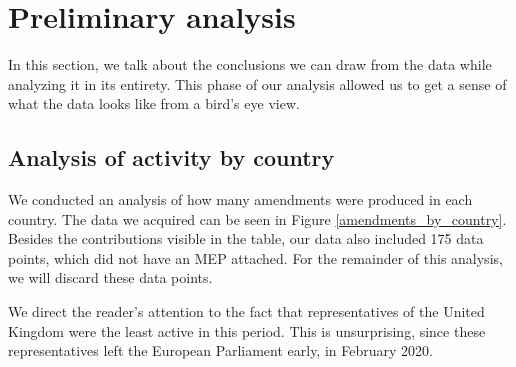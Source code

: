 \documentclass[lettersize,journal]{IEEEtran}
\begin{document}

\section{Preliminary analysis} \label{sec:prelim_anal}

In this section, we talk about the conclusions we can draw from the data while analyzing it in its entirety. This phase of our analysis allowed us to get a sense of what the data looks like from a bird's eye view.

\subsection{Analysis of activity by country} \label{countryactivity}


We conducted an analysis of how many amendments were produced in each country. The data we acquired can be seen in Figure \ref{amendments_by_country}. Besides the contributions visible in the table, our data also included 175 data points, which did not have an MEP attached. For the remainder of this analysis, we will discard these data points.

We direct the reader's attention to the fact that representatives of the United Kingdom were the least active in this period. This is unsurprising, since these representatives left the European Parliament early, in February 2020.
\end{document}
